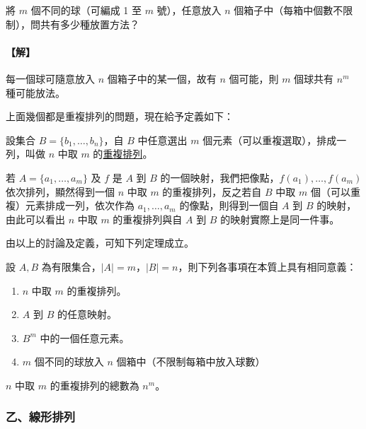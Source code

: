 \vspace{1em}
\begin{discussion}\label{disc:b5s-2-2}
將 $m$ 個不同的球（可編成 1 至 $m$ 號），任意放入 $n$ 個箱子中（每箱中個數不限制），問共有多少種放置方法？
\end{discussion}
\paragraph{【解】}
每一個球可隨意放入 $n$ 個箱子中的某一個，故有 $n$ 個可能，則 $m$ 個球共有 $n^m$ 種可能放法。

\vspace{0.5em}
上面幾個都是重複排列的問題，現在給予定義如下：

\begin{definition*}
設集合 $B=\{b_1, \dots, b_n\}$，自 $B$ 中任意選出 $m$ 個元素（可以重複選取），排成一列，叫做 $n$ 中取 $m$ 的\underline{重複排列}。
\end{definition*}

若 $A = \{a_1, \dots, a_m\}$ 及 $f$ 是 $A$ 到 $B$ 的一個映射，我們把像點，$f(a_1), \dots, f(a_m)$ 依次排列，顯然得到一個 $n$ 中取 $m$ 的重複排列，反之若自 $B$ 中取 $m$ 個（可以重複）元素排成一列，依次作為 $a_1, \dots, a_m$ 的像點，則得到一個自 $A$ 到 $B$ 的映射，由此可以看出 $n$ 中取 $m$ 的重複排列與自 $A$ 到 $B$ 的映射實際上是同一件事。

由以上的討論及定義，可知下列定理成立。

\begin{theorem}\label{thm:b5s-2-4}
設 $A, B$ 為有限集合，$|A|=m$，$|B|=n$，則下列各事項在本質上具有相同意義：
\begin{enumerate}[label=\Roman*., itemsep=2pt, topsep=2pt]
  \item $n$ 中取 $m$ 的重複排列。
  \item $A$ 到 $B$ 的任意映射。
  \item $B^m$ 中的一個任意元素。
  \item $m$ 個不同的球放入 $n$ 個箱中（不限制每箱中放入球數）
\end{enumerate}
\end{theorem}

\begin{corollary*}
$n$ 中取 $m$ 的重複排列的總數為 $n^m$。
\end{corollary*}

\subsubsection*{乙、線形排列}

